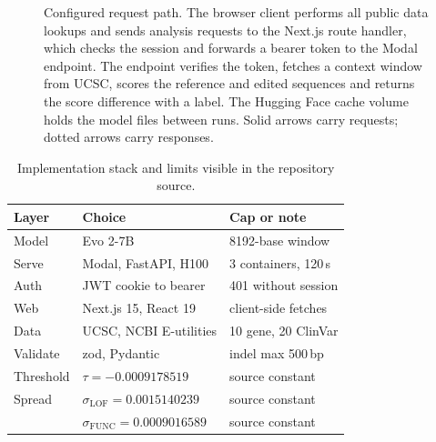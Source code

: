 \documentclass[10pt,journal]{IEEEtran}
\begin{document}
\begin{figure}[!t]
\caption{Configured request path. The browser client performs all public data lookups and sends analysis requests to the Next.js route handler, which checks the session and forwards a bearer token to the Modal endpoint. The endpoint verifies the token, fetches a context window from UCSC, scores the reference and edited sequences and returns the score difference with a label. The Hugging Face cache volume holds the model files between runs. Solid arrows carry requests; dotted arrows carry responses.}
\label{fig:arch}
\end{figure}

\begin{table}[!t]
\caption{Implementation stack and limits visible in the repository source.}
\label{tab:stack}
\centering
\footnotesize
\begin{tabular}{@{}lll@{}}
\toprule
Layer & Choice & Cap or note \\
\midrule
Model & Evo 2-7B & 8192-base window \\
Serve & Modal, FastAPI, H100 & 3 containers, 120\,s \\
Auth & JWT cookie to bearer & 401 without session \\
Web & Next.js 15, React 19 & client-side fetches \\
Data & UCSC, NCBI E-utilities & 10 gene, 20 ClinVar \\
Validate & zod, Pydantic & indel max 500\,bp \\
Threshold & $\tau=-0.0009178519$ & source constant \\
Spread & $\sigma_{\mathrm{LOF}}=0.0015140239$ & source constant \\
 & $\sigma_{\mathrm{FUNC}}=0.0009016589$ & source constant \\
\bottomrule
\end{tabular}
\end{table}
\end{document}
